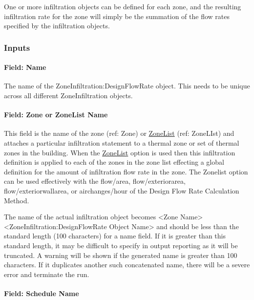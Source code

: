 One or more infiltration objects can be defined for each zone, and the resulting infiltration rate for the zone will simply be the summation of the flow rates specified by the infiltration objects.

\subsubsection{Inputs}\label{inputs-005}

\paragraph{Field: Name}\label{field-name-005}

The name of the ZoneInfiltration:DesignFlowRate object. This needs to be unique across all different ZoneInfiltration objects.

\paragraph{Field: Zone or ZoneList Name}\label{field-zone-or-zonelist-name}

This field is the name of the zone (ref: Zone) or \hyperref[zonelist]{ZoneList} (ref: ZoneLIst) and attaches a particular infiltration statement to a thermal zone or set of thermal zones in the building. When the \hyperref[zonelist]{ZoneList} option is used then this infiltration definition is applied to each of the zones in the zone list effecting a global definition for the amount of infiltration flow rate in the zone. The Zonelist option can be used effectively with the flow/area, flow/exteriorarea, flow/exteriorwallarea, or airchanges/hour of the Design Flow Rate Calculation Method.

The name of the actual infiltration object becomes \textless{}Zone Name\textgreater{} \textless{}ZoneInfiltration:DesignFlowRate Object Name\textgreater{} and should be less than the standard length (100 characters) for a name field. If it is greater than this standard length, it may be difficult to specify in output reporting as it will be truncated. A warning will be shown if the generated name is greater than 100 characters. If it duplicates another such concatenated name, there will be a severe error and terminate the run.

\paragraph{Field: Schedule Name}\label{field-schedule-name-000}

